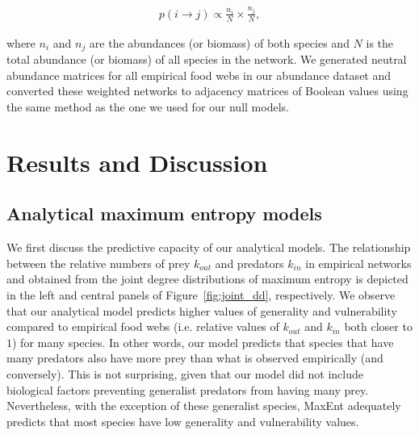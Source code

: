 \begin{box3.2}
\begin{eqnarray}
\label{eq:neutralmodel}
    p(i \rightarrow j) \propto \frac{n_i}{N} \times \frac{n_j}{N},
\end{eqnarray}
  
where $n_i$ and $n_j$ are the abundances (or biomass) of both species and $N$ is
the total abundance (or biomass) of all species in the network. We generated
neutral abundance matrices for all empirical food webs in our abundance dataset
and converted these weighted networks to adjacency matrices of Boolean values
using the same method as the one we used for our null models. 

\end{box3.2}

\section{Results and Discussion}

\subsection{Analytical maximum entropy models}

We first discuss the predictive capacity of our analytical models. The
relationship between the relative numbers of prey $k_{out}$ and predators
$k_{in}$ in empirical networks and obtained from the joint degree distributions
of maximum entropy is depicted in the left and central panels of
Figure~\ref{fig:joint_dd}, respectively. We observe that our analytical model predicts
higher values of generality and vulnerability compared to empirical food webs
(i.e. relative values of $k_{out}$ and $k_{in}$ both closer to $1$) for many
species. In other words, our model predicts that species that have many
predators also have more prey than what is observed empirically (and
conversely). This is not surprising, given that our model did not include
biological factors preventing generalist predators from having many prey.
Nevertheless, with the exception of these generalist species, MaxEnt adequately
predicts that most species have low generality and vulnerability values.

